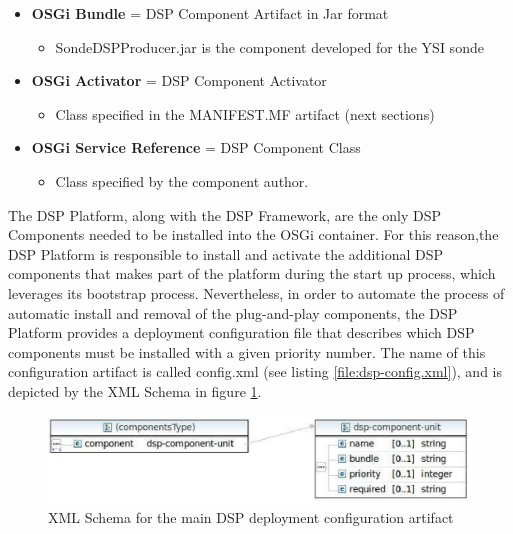 \begin{itemize}
  \item \textbf{OSGi Bundle} = DSP Component Artifact in Jar format
  \begin{itemize}
    \item SondeDSPProducer.jar is the component developed for the YSI sonde
  \end{itemize}  
  \item \textbf{OSGi Activator} = DSP Component Activator
  \begin{itemize}
    \item Class specified in the MANIFEST.MF artifact (next sections)
  \end{itemize} 
  \item \textbf{OSGi Service Reference} = DSP Component Class
  \begin{itemize}
    \item  Class specified by the component author.
  \end{itemize}
\end{itemize}

The DSP Platform, along with the DSP Framework, are the only DSP Components
needed to be installed into the OSGi container. For this reason,the DSP
Platform is responsible to install and activate the additional DSP components
that makes part of the platform during the start up process, which leverages
its bootstrap process. Nevertheless, in order to automate the process of
automatic install and removal of the plug-and-play components, the DSP Platform
provides a deployment configuration file that describes which DSP components
must be installed with a given priority number. The name of this configuration
artifact is called config.xml (see listing \ref{file:dsp-config.xml}), and is
depicted by the XML Schema \cite{xml-schema} in figure
\ref{fig:dsp-config-schema}.

\begin{figure}[h]
  \centering
  \includegraphics[scale=0.8]{../diagrams/config-schema}
  \caption{XML Schema for the main DSP deployment configuration artifact}
  \label{fig:dsp-config-schema}
\end{figure}

